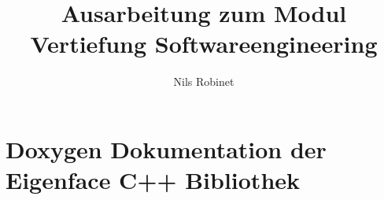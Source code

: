 \documentclass[a4paper,12pt,numbers=noenddot]{scrreprt}
\title{Ausarbeitung zum Modul Vertiefung Softwareengineering}
\author{Nils Robinet}
\begin{document}
\maketitle

\tableofcontents

\setcounter{page}{1}







\appendix
\chapter{Doxygen Dokumentation der Eigenface C++ Bibliothek}
\label{chap:doxy}
    
\end{document}
